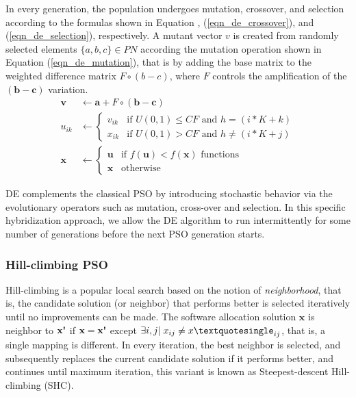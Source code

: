 In every generation, the population undergoes mutation, crossover, and selection according to the formulas shown in Equation , (\ref{eqn_de_crossover}), and (\ref{eqn_de_selection}), respectively. A mutant vector $v$ is created from randomly selected elements $\{a,b,c\}\in PN$ according the mutation operation shown in Equation (\ref{eqn_de_mutation}), that is by adding the base matrix to the weighted difference matrix $F\circ(b-c)$, where $F$ controls the amplification of the $(\textbf{b}-\textbf{c})$ variation.
\begin{align}
    \label{eqn_de_mutation}
    \textbf{v} & \leftarrow   \textbf{a} + F\circ(\textbf{b}-\textbf{c})\\
    \label{eqn_de_crossover}
    u_{ik} & \leftarrow 
    \begin{cases}
    v_{ik} & \mbox{if } U(0,1) \leq CF \mbox{ and } h = (i*K+k)\\
    x_{ik} & \mbox{if } U(0,1) > CF \mbox{ and } h \neq (i*K+j)
    \end{cases}\\
    \label{eqn_de_selection}
    \textbf{x} &\leftarrow 
    \begin{cases}
    \textbf{u} & \mbox{if } f(\textbf{u}) < f(\textbf{x})\mbox{ functions}\\
    \textbf{x} & \mbox{otherwise }
    \end{cases}
\end{align}

DE complements the classical PSO by introducing stochastic behavior via the evolutionary operators such as mutation, cross-over and selection. In this specific hybridization approach, we allow the DE algorithm to run intermittently for some number of generations before the next PSO generation starts.

\subsubsection{Hill-climbing PSO}
Hill-climbing is a popular local search based on the notion of \textit{neighborhood}, that is, the candidate solution (or neighbor) that performs better is selected iteratively until no improvements can be made. The software allocation solution $\textbf{x}$ is neighbor to $\textbf{x\textquotesingle}$ if $\textbf{x}=\textbf{x\textquotesingle}$ except $\exists i,j|\;x_{ij}\neq x\textquotesingle_{ij}$, that is, a single mapping is different. In every iteration, the best neighbor is selected, and subsequently replaces the current candidate solution if it performs better, and continues until maximum iteration, this variant is known as Steepest-descent Hill-climbing (SHC).

